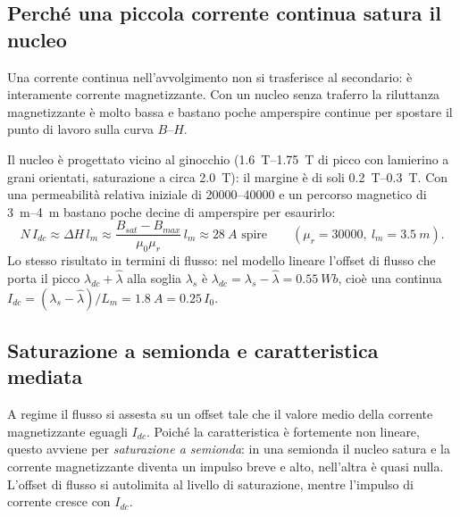 \documentclass[10pt,a4paper]{scrartcl}
\newcommand{\Lm}{L_m}
\newcommand{\lamhat}{\hat\lambda}
\newcommand{\lams}{\lambda_s}
\newcommand{\lamdc}{\lambda_{dc}}
\newcommand{\Idc}{I_{dc}}
\newcommand{\Izero}{I_0}
\begin{document}
\begin{onehalfspace}
\section{Perché una piccola corrente continua satura il nucleo}
\label{sec:saturazione}

Una corrente continua nell'avvolgimento non si trasferisce al secondario: è interamente corrente magnetizzante. Con un nucleo senza traferro la riluttanza magnetizzante è molto bassa e bastano poche amperspire continue per spostare il punto di lavoro sulla curva $B$--$H$.

Il nucleo è progettato vicino al ginocchio (\SIrange{1.6}{1.75}{T} di picco con lamierino a grani orientati, saturazione a circa \SI{2.0}{T}): il margine è di soli \SIrange{0.2}{0.3}{T}. Con una permeabilità relativa iniziale di \num{20000}--\num{40000} e un percorso magnetico di \SIrange{3}{4}{m} bastano poche decine di amperspire per esaurirlo:
\begin{equation}
N\,\Idc \approx \Delta H\,l_m \approx \frac{B_{sat} - B_{max}}{\mu_0\mu_r}\,l_m \approx \SI{28}{A}\text{ spire} \qquad (\mu_r = \num{30000},\ l_m = \SI{3.5}{m}).
\label{eq:amperspire}
\end{equation}
Lo stesso risultato in termini di flusso: nel modello lineare l'offset di flusso che porta il picco $\lamdc + \lamhat$ alla soglia $\lams$ è $\lamdc = \lams - \lamhat = \SI{0.55}{Wb}$, cioè una continua $\Idc = (\lams - \lamhat)/\Lm = \SI{1.8}{A} = \num{0.25}\,\Izero$.

\subsection{Saturazione a semionda e caratteristica mediata}
\label{sec:semionda}

A regime il flusso si assesta su un offset tale che il valore medio della corrente magnetizzante eguagli $\Idc$. Poiché la caratteristica è fortemente non lineare, questo avviene per \emph{saturazione a semionda}: in una semionda il nucleo satura e la corrente magnetizzante diventa un impulso breve e alto, nell'altra è quasi nulla. L'offset di flusso si autolimita al livello di saturazione, mentre l'impulso di corrente cresce con $\Idc$.


\end{onehalfspace}
\end{document}
